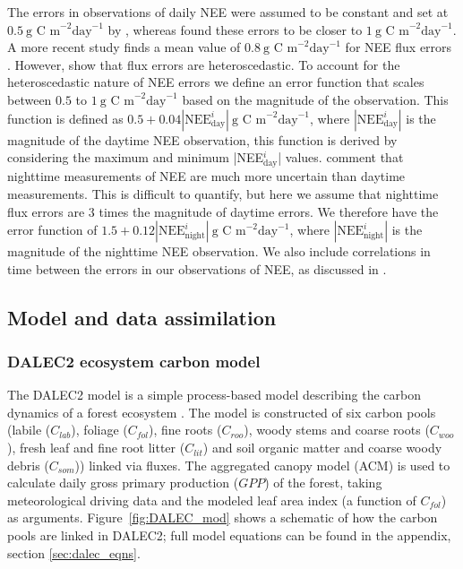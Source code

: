 \documentclass[draft,linenumbers]{agujournal}
\begin{document}
The errors in observations of daily NEE were assumed to be constant and set at $0.5~\text{g C m}^{-2} \text{day}^{-1}$ by \citet{williams2005improved}, whereas \citet{braswell2005estimating} found these errors to be closer to $1~\text{g C m}^{-2} \text{day}^{-1}$. {\color{blue}A more recent study finds a mean value of $0.8~\text{g C m}^{-2} \text{day}^{-1}$ for NEE flux errors \citep{Post2015_fluxerr}}. However, \citet{Richardson200838} show that flux errors are heteroscedastic. To account for the heteroscedastic nature of NEE errors we define an error function that scales between $0.5$ to $1~\text{g C m}^{-2} \text{day}^{-1}$ based on the magnitude of the observation. This function is defined as $0.5 + 0.04|\text{NEE}_{\text{day}}^{i}|~\text{g C m}^{-2} \text{day}^{-1}$, where \(|\text{NEE}_{\text{day}}^{i}|\) is the magnitude of the daytime NEE observation, {\color{blue}this function is derived by considering the maximum and minimum |NEE$_{\text{day}}^i$| values}. \citet{raupach2005model} comment that nighttime measurements of NEE are much more uncertain than daytime measurements. This is difficult to quantify, but here we assume that nighttime flux errors are 3 times the magnitude of daytime errors. We therefore have the error function of $1.5 + 0.12|\text{NEE}_{\text{night}}^{i}|~\text{g C m}^{-2} \text{day}^{-1}$, where \(|\text{NEE}_{\text{night}}^{i}|\) is the magnitude of the nighttime NEE observation. We also include correlations in time between the errors in our observations of NEE, as discussed in \citet{Pinnington2016299}.

\subsection{Model and data assimilation}
\subsubsection{DALEC2 ecosystem carbon model} \label{sec:dalec2}

The DALEC2 model is a simple process-based model describing the carbon dynamics of a forest ecosystem \citep{Bloom2015}. The model is constructed of six carbon pools (labile ($C_{lab}$), foliage ($C_{fol}$), fine roots ($C_{roo}$), woody stems and coarse roots ($C_{woo}$), fresh leaf and fine root litter ($C_{lit}$) and soil organic matter and coarse woody debris ($C_{som}$)) linked via fluxes. The aggregated canopy model (ACM) \citep{williams1997predicting} is used to calculate daily gross primary production ($GPP$) of the forest, taking meteorological driving data and the {\color{blue}modeled} leaf area index (a function of $C_{fol}$) as arguments. Figure~\ref{fig:DALEC_mod} shows a schematic of how the carbon pools are linked in DALEC2; full model equations can be found in the appendix, section \ref{sec:dalec_eqns}.   
\end{document}
